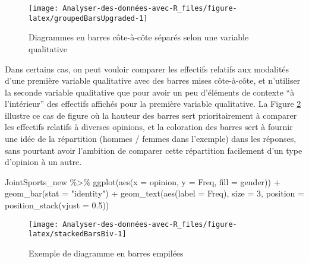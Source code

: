 \documentclass[
]{book}
\newenvironment{Shaded}{\begin{snugshade}}{\end{snugshade}}
\newcommand{\AttributeTok}[1]{\textcolor[rgb]{0.77,0.63,0.00}{#1}}
\newcommand{\DecValTok}[1]{\textcolor[rgb]{0.00,0.00,0.81}{#1}}
\newcommand{\FloatTok}[1]{\textcolor[rgb]{0.00,0.00,0.81}{#1}}
\newcommand{\FunctionTok}[1]{\textcolor[rgb]{0.00,0.00,0.00}{#1}}
\newcommand{\NormalTok}[1]{#1}
\newcommand{\SpecialCharTok}[1]{\textcolor[rgb]{0.00,0.00,0.00}{#1}}
\newcommand{\StringTok}[1]{\textcolor[rgb]{0.31,0.60,0.02}{#1}}
\begin{document}
\begin{figure}

{\centering \texttt{[image: Analyser-des-données-avec-R\_files/figure-latex/groupedBarsUpgraded-1]} 

}

\caption{Diagrammes en barres côte-à-côte séparés selon une variable qualitative}\label{fig:groupedBarsUpgraded}
\end{figure}

Dans certains cas, on peut vouloir comparer les effectifs relatifs aux modalités d'une première variable qualitative avec des barres mises côte-à-côte, et n'utiliser la seconde variable qualitative que pour avoir un peu d'éléments de contexte ``à l'intérieur'' des effectifs affichés pour la première variable qualitative. La Figure \ref{fig:stackedBarsBiv} illustre ce cas de figure où la hauteur des barres sert prioritairement à comparer les effectifs relatifs à diverses opinions, et la coloration des barres sert à fournir une idée de la répartition (hommes / femmes dans l'exemple) dans les réponses, sans pourtant avoir l'ambition de comparer cette répartition facilement d'un type d'opinion à un autre.

\begin{Shaded}
\begin{Highlighting}[]
\NormalTok{JointSports\_new }\SpecialCharTok{\%\textgreater{}\%}
  \FunctionTok{ggplot}\NormalTok{(}\FunctionTok{aes}\NormalTok{(}\AttributeTok{x =}\NormalTok{ opinion, }\AttributeTok{y =}\NormalTok{ Freq, }\AttributeTok{fill =}\NormalTok{ gender)) }\SpecialCharTok{+}
  \FunctionTok{geom\_bar}\NormalTok{(}\AttributeTok{stat =} \StringTok{"identity"}\NormalTok{) }\SpecialCharTok{+}
  \FunctionTok{geom\_text}\NormalTok{(}\FunctionTok{aes}\NormalTok{(}\AttributeTok{label =}\NormalTok{ Freq), }\AttributeTok{size =} \DecValTok{3}\NormalTok{, }\AttributeTok{position =} \FunctionTok{position\_stack}\NormalTok{(}\AttributeTok{vjust =} \FloatTok{0.5}\NormalTok{))}
\end{Highlighting}
\end{Shaded}

\begin{figure}

{\centering \texttt{[image: Analyser-des-données-avec-R\_files/figure-latex/stackedBarsBiv-1]} 

}

\caption{Exemple de diagramme en barres empilées}\label{fig:stackedBarsBiv}
\end{figure}
\end{document}
